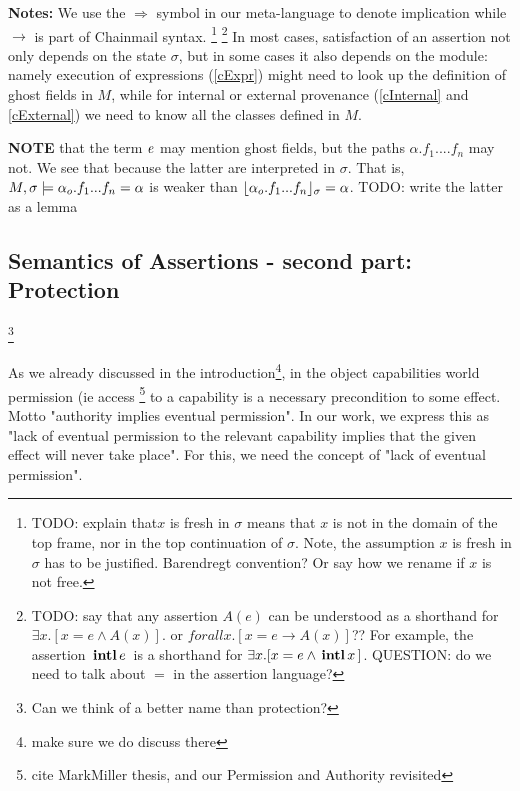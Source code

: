 \textbf{Notes:}  We use the $\Longrightarrow$ symbol in our meta-language to denote implication while $\rightarrow$ is part of Chainmail syntax.
\footnote{{TODO: explain that$x$ is fresh in $\sigma$  means that $x$ is not in the domain of the top frame, nor in the top continuation of $\sigma$.
 Note, the assumption $x$ is fresh in $\sigma$ has to be justified. Barendregt convention? Or say how we rename if $x$ is not free.}}
\footnote{{TODO: say that any assertion $A(e)$ can be understood as a shorthand for $\exists x. [ x=e \wedge A(x)]$. or  $forall x. [ x=e \rightarrow A(x)]$?? For example, the  assertion   ${{\, \mathbf{intl}\, e\, }}$ is a shorthand for $\exists x. [ x=e \wedge {{\ensuremath{\, \mathbf{intl}}\, x\, }}]$. QUESTION: do we need to talk about $=$ in the assertion language?}}
In most cases, satisfaction of an assertion not only depends on the state $\sigma$, but 
in some cases it also depends on the module: namely execution of expressions (\ref{cExpr}) might need to look up the definition of ghost fields  in $M$, while 
for internal or external provenance (\ref{cInternal} and \ref{cExternal}) we need to know all the classes defined in $M$.

{\textbf{NOTE}  that the term $\mathit{e}$ may mention ghost fields, but the paths $\alpha.f_1....f_n$ may not. We see that because the latter are interpreted in $\sigma$. That is, $M , \sigma \models {\alpha_o.f_1...f_n}=\alpha$ is weaker than $\lfloor \alpha_{o}.f_1...f_n \rfloor_{\sigma}=\alpha$. TODO: write the latter as a lemma}


\subsection{Semantics of Assertions - second part: Protection}\footnote{Can we think of a better name than protection?}

As we already discussed in the introduction\footnote{make sure we do discuss there}, in the object capabilities world permission (ie access  \footnote{cite MarkMiller thesis, and our Permission and Authority revisited} to a capability is a necessary precondition to some effect. Motto "authority implies eventual permission".
In our work, we express this as "lack of eventual permission to the relevant capability implies that the given effect will never take place".
For this, we need the concept of "lack of  eventual permission".  


